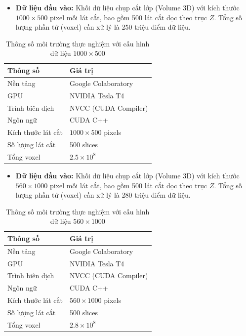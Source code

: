 \begin{itemize}    
    \item \textbf{Dữ liệu đầu vào:} Khối dữ liệu chụp cắt lớp (Volume 3D) với kích thước $1000 \times 500$ pixel mỗi lát cắt, bao gồm 500 lát cắt dọc theo trục $Z$. Tổng số lượng phần tử (voxel) cần xử lý là 250 triệu điểm dữ liệu.
\end{itemize}

\begin{table}[h!]
\caption{Thông số môi trường thực nghiệm với cấu hình dữ liệu $1000 \times 500$}
\label{tab:env_1000x500}
\centering
\begin{tabular}{l l}
    \toprule
    \textbf{Thông số} & \textbf{Giá trị} \\
    \midrule
    Nền tảng & Google Colaboratory \\
    GPU & NVIDIA Tesla T4 \\
    Trình biên dịch & NVCC (CUDA Compiler) \\
    Ngôn ngữ & CUDA C++ \\
    Kích thước lát cắt & $1000 \times 500$ pixels \\
    Số lượng lát cắt & 500 slices \\
    Tổng voxel & $2.5 \times 10^8$ \\
    \bottomrule
\end{tabular}
\end{table}

\begin{itemize}
    \item \textbf{Dữ liệu đầu vào:} Khối dữ liệu chụp cắt lớp (Volume 3D) với kích thước $560 \times 1000$ pixel mỗi lát cắt, bao gồm 500 lát cắt dọc theo trục $Z$. Tổng số lượng phần tử (voxel) cần xử lý là 280 triệu điểm dữ liệu.
\end{itemize}

\begin{table}[h!]
\caption{Thông số môi trường thực nghiệm với cấu hình dữ liệu $560 \times 1000$}
\label{tab:env_560x1000}
\centering
\begin{tabular}{l l}
    \toprule
    \textbf{Thông số} & \textbf{Giá trị} \\
    \midrule
    Nền tảng & Google Colaboratory \\
    GPU & NVIDIA Tesla T4 \\
    Trình biên dịch & NVCC (CUDA Compiler) \\
    Ngôn ngữ & CUDA C++ \\
    Kích thước lát cắt & $560 \times 1000$ pixels \\
    Số lượng lát cắt & 500 slices \\
    Tổng voxel & $2.8 \times 10^8$ \\
    \bottomrule
\end{tabular}
\end{table}

